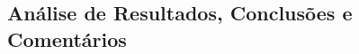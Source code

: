 \documentclass[a4paper,12pt]{article}  %
\begin{document}
\subsection{\sf Análise de Resultados, Conclusões e Comentários}
\noindent\underline{\makebox[\textwidth][r]{~}} \\
\noindent\underline{\makebox[\textwidth][r]{~}} \\
\noindent\underline{\makebox[\textwidth][r]{~}} \\
\noindent\underline{\makebox[\textwidth][r]{~}} \\
\noindent\underline{\makebox[\textwidth][r]{~}} \\
\noindent\underline{\makebox[\textwidth][r]{~}} \\
\noindent\underline{\makebox[\textwidth][r]{~}} \\
\noindent\underline{\makebox[\textwidth][r]{~}} \\
\noindent\underline{\makebox[\textwidth][r]{~}} \\
\noindent\underline{\makebox[\textwidth][r]{~}} \\
\noindent\underline{\makebox[\textwidth][r]{~}} \\
\noindent\underline{\makebox[\textwidth][r]{~}} \\
\noindent\underline{\makebox[\textwidth][r]{~}} \\
\noindent\underline{\makebox[\textwidth][r]{~}} \\
\noindent\underline{\makebox[\textwidth][r]{~}} \\
\noindent\underline{\makebox[\textwidth][r]{~}} \\
\noindent\underline{\makebox[\textwidth][r]{~}} \\
\noindent\underline{\makebox[\textwidth][r]{~}} \\
\noindent\underline{\makebox[\textwidth][r]{~}} \\
\noindent\underline{\makebox[\textwidth][r]{~}} \\
\noindent\underline{\makebox[\textwidth][r]{~}} \\
\noindent\underline{\makebox[\textwidth][r]{~}} \\
\noindent\underline{\makebox[\textwidth][r]{~}} \\





\newpage









\end{document}
